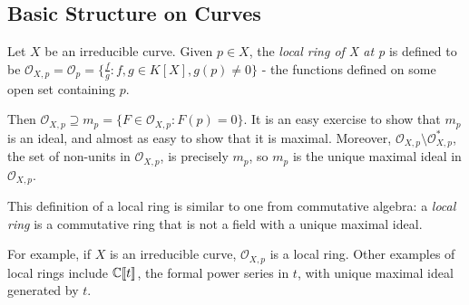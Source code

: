 \documentclass[10pt,a4paper,rgb]{article}
\begin{document}
\subsection{Basic Structure on Curves}
Let $X$ be an irreducible curve. Given $p \in X$, the \emph{local ring of X at p} is defined to be $\mathcal{O}_{X,p} = \mathcal{O}_p = \{\frac{f}{g} : f,g \in K[X], g(p) \neq 0\}$ - the functions defined on some open set containing $p$.

Then $\mathcal{O}_{X,p} \supseteq m_p = \{F \in \mathcal{O}_{X,p} : F(p) = 0\}$. It is an easy exercise to show that $m_p$ is an ideal, and almost as easy to show that it is maximal. Moreover, $\mathcal{O}_{X,p} \setminus \mathcal{O}_{X,p}^{\ast}$, the set of non-units in $\mathcal{O}_{X,p}$, is precisely $m_p$, so $m_p$ is the unique maximal ideal in $\mathcal{O}_{X,p}$.

This definition of a local ring is similar to one from commutative algebra: a \emph{local ring} is a commutative ring that is not a field with a unique maximal ideal.

For example, if $X$ is an irreducible curve, $\mathcal{O}_{X,p}$ is a local ring. Other examples of local rings include $\mathbb{C}\llbracket t\rrbracket$, the formal power series in $t$, with unique maximal ideal generated by $t$. 
\end{document}
